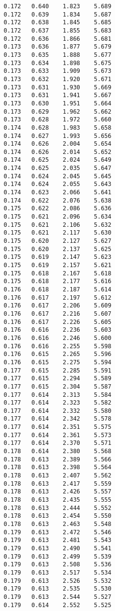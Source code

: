 \begin{verbatim}
   0.172   0.640    1.823    5.689
   0.172   0.639    1.834    5.687
   0.172   0.638    1.845    5.685
   0.172   0.637    1.855    5.683
   0.172   0.636    1.866    5.681
   0.173   0.636    1.877    5.679
   0.173   0.635    1.888    5.677
   0.173   0.634    1.898    5.675
   0.173   0.633    1.909    5.673
   0.173   0.632    1.920    5.671
   0.173   0.631    1.930    5.669
   0.173   0.631    1.941    5.667
   0.173   0.630    1.951    5.664
   0.173   0.629    1.962    5.662
   0.173   0.628    1.972    5.660
   0.174   0.628    1.983    5.658
   0.174   0.627    1.993    5.656
   0.174   0.626    2.004    5.654
   0.174   0.626    2.014    5.652
   0.174   0.625    2.024    5.649
   0.174   0.625    2.035    5.647
   0.174   0.624    2.045    5.645
   0.174   0.624    2.055    5.643
   0.174   0.623    2.066    5.641
   0.174   0.622    2.076    5.638
   0.175   0.622    2.086    5.636
   0.175   0.621    2.096    5.634
   0.175   0.621    2.106    5.632
   0.175   0.621    2.117    5.630
   0.175   0.620    2.127    5.627
   0.175   0.620    2.137    5.625
   0.175   0.619    2.147    5.623
   0.175   0.619    2.157    5.621
   0.175   0.618    2.167    5.618
   0.175   0.618    2.177    5.616
   0.176   0.618    2.187    5.614
   0.176   0.617    2.197    5.612
   0.176   0.617    2.206    5.609
   0.176   0.617    2.216    5.607
   0.176   0.617    2.226    5.605
   0.176   0.616    2.236    5.603
   0.176   0.616    2.246    5.600
   0.176   0.616    2.255    5.598
   0.176   0.615    2.265    5.596
   0.176   0.615    2.275    5.594
   0.177   0.615    2.285    5.591
   0.177   0.615    2.294    5.589
   0.177   0.615    2.304    5.587
   0.177   0.614    2.313    5.584
   0.177   0.614    2.323    5.582
   0.177   0.614    2.332    5.580
   0.177   0.614    2.342    5.578
   0.177   0.614    2.351    5.575
   0.177   0.614    2.361    5.573
   0.177   0.614    2.370    5.571
   0.178   0.614    2.380    5.568
   0.178   0.613    2.389    5.566
   0.178   0.613    2.398    5.564
   0.178   0.613    2.407    5.562
   0.178   0.613    2.417    5.559
   0.178   0.613    2.426    5.557
   0.178   0.613    2.435    5.555
   0.178   0.613    2.444    5.552
   0.178   0.613    2.454    5.550
   0.178   0.613    2.463    5.548
   0.179   0.613    2.472    5.546
   0.179   0.613    2.481    5.543
   0.179   0.613    2.490    5.541
   0.179   0.613    2.499    5.539
   0.179   0.613    2.508    5.536
   0.179   0.613    2.517    5.534
   0.179   0.613    2.526    5.532
   0.179   0.613    2.535    5.530
   0.179   0.613    2.544    5.527
   0.179   0.614    2.552    5.525

\end{verbatim}
